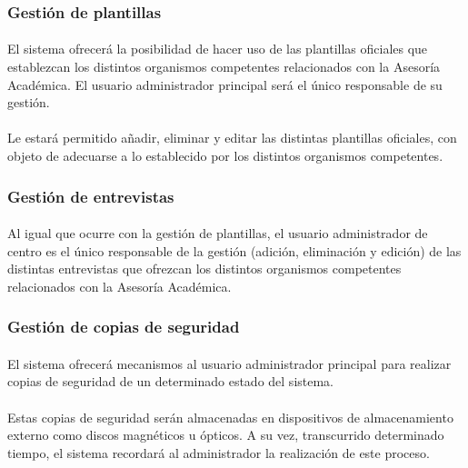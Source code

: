       \subsubsection{Gestión de plantillas}

      \paragraph{}El sistema ofrecerá la posibilidad de hacer uso de las
      plantillas oficiales que establezcan los distintos organismos competentes
      relacionados con la Asesoría Académica. El usuario administrador principal
      será el único responsable de su gestión.

      \paragraph{}Le estará permitido añadir, eliminar y editar las distintas
      plantillas oficiales, con objeto de adecuarse a lo establecido por los
      distintos organismos competentes.

      \subsubsection{Gestión de entrevistas}

      \paragraph{}Al igual que ocurre con la gestión de plantillas, el usuario
      administrador de centro es el único responsable de la gestión (adición,
      eliminación y edición) de las distintas entrevistas que ofrezcan los
      distintos organismos competentes relacionados con la Asesoría Académica.

      \subsubsection{Gestión de copias de seguridad}

      \paragraph{}El sistema ofrecerá mecanismos al usuario administrador
      principal para realizar copias de seguridad de un determinado estado del
      sistema.

      \paragraph{}Estas copias de seguridad serán almacenadas en dispositivos
      de almacenamiento externo como discos magnéticos u ópticos. A su vez,
      transcurrido determinado tiempo, el sistema recordará al administrador
      la realización de este proceso.

